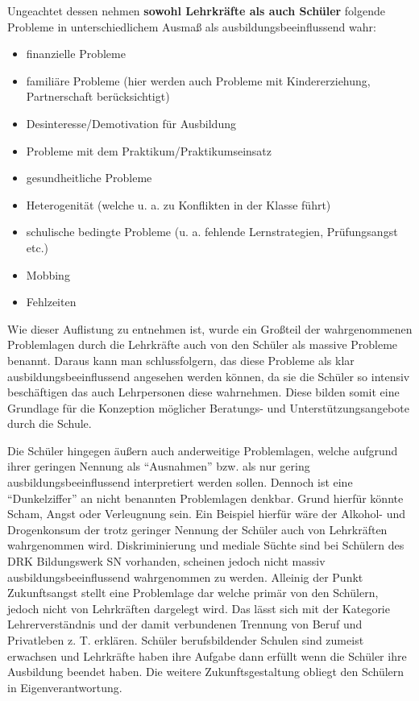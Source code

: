 \noindent
Ungeachtet dessen nehmen \textbf{sowohl Lehrkräfte als auch Schüler} folgende Probleme in unterschiedlichem Ausmaß als ausbildungsbeeinflussend wahr:  
\begin{itemize}
	\item finanzielle Probleme
	\item familiäre Probleme (hier werden auch Probleme mit Kindererziehung, Partnerschaft berücksichtigt)
	\item Desinteresse/Demotivation für Ausbildung
	\item Probleme mit dem Praktikum/Praktikumseinsatz
	\item gesundheitliche Probleme
	\item Heterogenität (welche u. a. zu Konflikten in der Klasse führt)
	\item schulische bedingte Probleme (u. a. fehlende Lernstrategien, Prüfungsangst etc.)
	\item Mobbing
	\item Fehlzeiten
\end{itemize}

\noindent
Wie dieser Auflistung zu entnehmen ist, wurde ein Großteil der wahrgenommenen Problemlagen durch die Lehrkräfte auch von den Schüler als massive Probleme benannt. Daraus kann man schlussfolgern, das diese Probleme als klar ausbildungsbeeinflussend angesehen werden können, da sie die Schüler so intensiv beschäftigen das auch Lehrpersonen diese wahrnehmen. Diese bilden somit eine Grundlage für die Konzeption möglicher Beratungs- und Unterstützungsangebote durch die Schule.

Die Schüler hingegen äußern auch anderweitige Problemlagen, welche aufgrund ihrer geringen Nennung als "`Ausnahmen"' bzw. als nur gering ausbildungsbeeinflussend interpretiert werden sollen. Dennoch ist eine "`Dunkelziffer"' an nicht benannten Problemlagen denkbar. Grund hierfür könnte Scham, Angst oder Verleugnung sein. Ein Beispiel hierfür wäre der Alkohol- und Drogenkonsum der trotz geringer Nennung der Schüler auch von Lehrkräften wahrgenommen wird. Diskriminierung und mediale Süchte sind bei Schülern des DRK Bildungswerk SN vorhanden, scheinen jedoch nicht massiv ausbildungsbeeinflussend wahrgenommen zu werden. Alleinig der Punkt Zukunftsangst stellt eine Problemlage dar welche primär von den Schülern, jedoch nicht von Lehrkräften dargelegt wird. Das lässt sich mit der Kategorie Lehrerverständnis und der damit verbundenen Trennung von Beruf und Privatleben z. T. erklären. Schüler berufsbildender Schulen sind zumeist erwachsen und Lehrkräfte haben ihre Aufgabe dann erfüllt wenn die Schüler ihre Ausbildung beendet haben. Die weitere Zukunftsgestaltung obliegt den Schülern in Eigenverantwortung.

